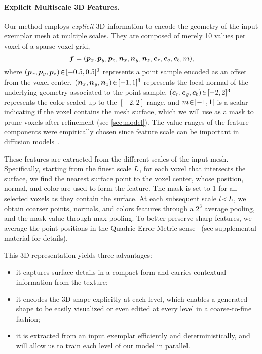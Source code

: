 \paragraph{Explicit Multiscale 3D Features.}
Our method employs \emph{explicit} 3D information to encode the geometry of the input exemplar mesh at multiple scales. They are composed of merely 10 values per voxel of a sparse voxel grid,
\begin{equation}
{\bm{f}} = ({\bm{p}}_x, {\bm{p}}_y, {\bm{p}}_z, {\bm{n}}_x, {\bm{n}}_y, {\bm{n}}_z, {\bm{c}}_r, {\bm{c}}_g, {\bm{c}}_b, m),
\end{equation}
where \(({\bm{p}}_x, {\bm{p}}_y, {\bm{p}}_z)\!\in\! [-0.5, 0.5]^3\) represents a point sample encoded as an offset from the voxel center, \(({\bm{n}}_x, {\bm{n}}_y, {\bm{n}}_z)\!\in\! [-1, 1]^3\) represents the local normal of the underlying geometry associated to the point sample,
\(({\bm{c}}_r, {\bm{c}}_g, {\bm{c}}_b)\!\in\! [-2, 2]^3\) represents the color scaled up to the \([-2, 2]\) range,
and \(m\!\in\! [-1, 1]\) is a scalar indicating if the voxel contains the mesh surface, which we will use as a mask to prune voxels after refinement (see \cref{sec:model}).
The value ranges of the feature components were empirically chosen since feature scale can be important in diffusion models~\cite{chen_importance_2023}. 

These features are extracted from the different scales of the input mesh.
Specifically, starting from the finest scale \(L\), for each voxel that intersects the surface, we find the nearest surface point to the voxel center, whose position, normal, and color are used to form the feature. The mask is set to 1 for all selected voxels as they contain the surface.
At each subsequent scale \(l\!<\!L\), we obtain coarser points, normals, and colors features through a \(2^{3}\) average pooling, and the mask value through max pooling. To better preserve sharp features, we average the point positions in the Quadric Error Metric sense~\cite{maruani_ponq_2024} (see supplemental material for details).

This 3D representation yields three advantages:
\begin{itemize}%
    \item it captures surface details in a compact form and carries contextual information from the texture;
    \item it encodes the 3D shape explicitly at each level, which enables a generated shape to be easily visualized or even edited at every level in a coarse-to-fine fashion;
    \item it is extracted from an input exemplar efficiently and deterministically, and will allow us to train each level of our model in parallel. 
\end{itemize}

